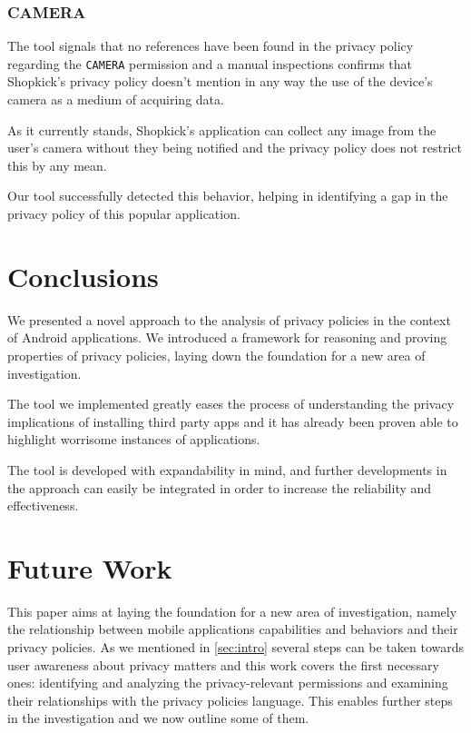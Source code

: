 \documentclass[twoside,letterpaper]{soups}
\theoremstyle{definition}
\begin{document}
\subsubsection{CAMERA}
The tool signals that no references have been found in the privacy policy regarding the \texttt{CAMERA} permission and a manual inspections confirms that Shopkick's privacy policy doesn't mention in any way the use of the device's camera as a medium of acquiring data.

As it currently stands, Shopkick's application can collect any image from the user's camera without they being notified and the privacy policy does not restrict this by any mean.

Our tool successfully detected this behavior, helping in identifying a gap in the privacy policy of this popular application.

\section{Conclusions}
\label{sec:conclusions}
We presented a novel approach to the analysis of privacy policies in the context of Android applications. We introduced a framework for reasoning and proving properties of privacy policies, laying down the foundation for a new area of investigation.

The tool we implemented greatly eases the process of understanding the privacy implications of installing third party apps and it has already been proven able to highlight worrisome instances of applications.

The tool is developed with expandability in mind, and further developments in the approach can easily be integrated in order to increase the reliability and effectiveness.

\section{Future Work}
\label{sec:future-work}
This paper aims at laying the foundation for a new area of investigation, namely the relationship between mobile applications capabilities and behaviors and their privacy policies. As we mentioned in \autoref{sec:intro} several steps can be taken towards user awareness about privacy matters and this work covers the first necessary ones: identifying and analyzing the privacy-relevant permissions and examining their relationships with the privacy policies language. This enables further steps in the investigation and we now outline some of them.
\end{document}
